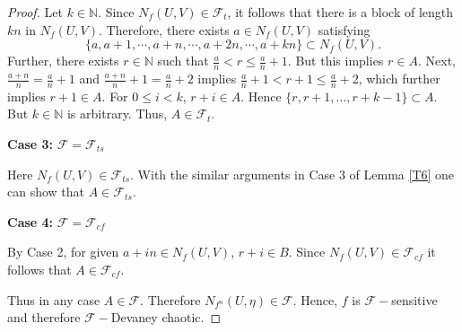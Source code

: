 \documentclass[10pt,a4paper]{amsart}
\def\F{{\mathscr{F}}}
\def\N{{\mathbb N}}
\begin{document}
\begin{proof}
	\noindent Let $k\in \N$. Since $N_f(U,V)\in \F_t$, it follows that there is a block of length $kn$ in $N_f(U,V)$. Therefore, there exists $a\in N_f(U,V)$ satisfying $$\{a,a+1,\cdots, a+n, \cdots, a+2n,\cdots , a+kn\}\subset N_f(U,V).$$
	Further, there exists $r\in \mathbb{N}$ such that $\frac{\displaystyle{a}}{\displaystyle{n}}< r \leq \frac{\displaystyle{a}}{\displaystyle{n}}+1.$ But this implies $r\in A$. Next, $\frac{\displaystyle{a+n}}{\displaystyle{n}}=\frac{\displaystyle{a}}{\displaystyle{n}}+1$ and $\frac{\displaystyle{a+n}}{\displaystyle{n}}+1=\frac{\displaystyle{a}}{\displaystyle{n}}+2$ implies
	$\frac{\displaystyle{a}}{\displaystyle{n}}+1 < r+1 \leq \frac{\displaystyle{a}}{\displaystyle{n}}+2$, which further implies $r+1\in A$. For $0\leq i<k$, $r+i\in A$. Hence $\{r,r+1,\dots,r+k-1\}\subset A$. But $k\in \N$ is arbitrary. Thus, $A\in \F_t$.
	
	\medskip
	\noindent \textbf{Case 3:} $\F=\F_{ts}$
	
	\noindent Here $N_f(U,V)\in \F_{ts}$. With the similar arguments in Case 3 of Lemma \ref{T6} one can show that $A\in \F_{ts}$. 
	
	
	\medskip
	\noindent \textbf{Case 4:} $\F=\F_{cf}$ 
	
	\noindent By Case 2, for given $a+in\in N_f(U,V)$, $r+i\in B$. Since $N_f(U,V)\in \F_{cf}$ it follows that $A\in \F_{cf}$.
	
	\smallskip
	\noindent Thus in any case $A\in \F$. Therefore $N_{f^n}(U,\eta)\in \F$. Hence, $f$ is $\F-$sensitive and therefore $\F-$Devaney chaotic.
\end{proof}
\end{document}

